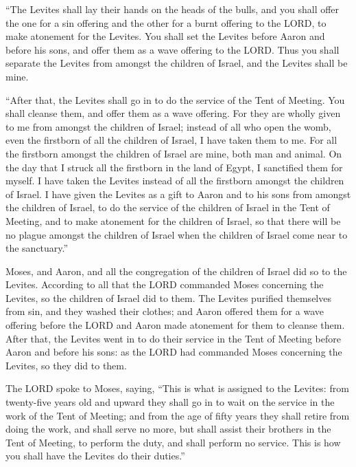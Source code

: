  ``The Levites shall lay their hands on the heads of the
bulls, and you shall offer the one for a sin offering and the other for
a burnt offering to the LORD, to make atonement for the Levites.
 You shall set the Levites before Aaron and before his
sons, and offer them as a wave offering to the LORD.  Thus
you shall separate the Levites from amongst the children of Israel, and
the Levites shall be mine.

 ``After that, the Levites shall go in to do the service of
the Tent of Meeting. You shall cleanse them, and offer them as a wave
offering.  For they are wholly given to me from amongst the
children of Israel; instead of all who open the womb, even the firstborn
of all the children of Israel, I have taken them to me. 
For all the firstborn amongst the children of Israel are mine, both man
and animal. On the day that I struck all the firstborn in the land of
Egypt, I sanctified them for myself.  I have taken the
Levites instead of all the firstborn amongst the children of Israel.
 I have given the Levites as a gift to Aaron and to his
sons from amongst the children of Israel, to do the service of the
children of Israel in the Tent of Meeting, and to make atonement for the
children of Israel, so that there will be no plague amongst the children
of Israel when the children of Israel come near to the sanctuary.''

 Moses, and Aaron, and all the congregation of the children
of Israel did so to the Levites. According to all that the LORD
commanded Moses concerning the Levites, so the children of Israel did to
them.  The Levites purified themselves from sin, and they
washed their clothes; and Aaron offered them for a wave offering before
the LORD and Aaron made atonement for them to cleanse them.
 After that, the Levites went in to do their service in the
Tent of Meeting before Aaron and before his sons: as the LORD had
commanded Moses concerning the Levites, so they did to them.

 The LORD spoke to Moses, saying,  ``This is
what is assigned to the Levites: from twenty-five years old and upward
they shall go in to wait on the service in the work of the Tent of
Meeting;  and from the age of fifty years they shall retire
from doing the work, and shall serve no more,  but shall
assist their brothers in the Tent of Meeting, to perform the duty, and
shall perform no service. This is how you shall have the Levites do
their duties.''

